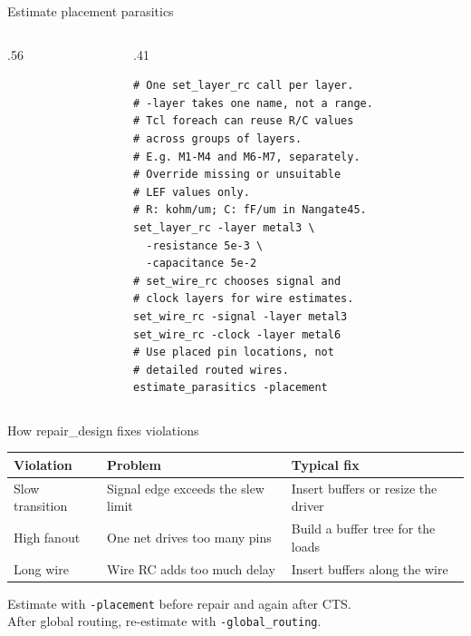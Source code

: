 \begin{frame}[fragile]{Estimate placement parasitics}
\begin{columns}[T,onlytextwidth]
\begin{column}{.56\textwidth}\centering
{}%
\end{column}
\begin{column}{.41\textwidth}
\begin{lstlisting}
# One set_layer_rc call per layer.
# -layer takes one name, not a range.
# Tcl foreach can reuse R/C values
# across groups of layers.
# E.g. M1-M4 and M6-M7, separately.
# Override missing or unsuitable
# LEF values only.
# R: kohm/um; C: fF/um in Nangate45.
set_layer_rc -layer metal3 \
  -resistance 5e-3 \
  -capacitance 5e-2
# set_wire_rc chooses signal and
# clock layers for wire estimates.
set_wire_rc -signal -layer metal3
set_wire_rc -clock -layer metal6
# Use placed pin locations, not
# detailed routed wires.
estimate_parasitics -placement
\end{lstlisting}
\end{column}
\end{columns}
\end{frame}

\begin{frame}{How repair\_design fixes violations}
\centering
\renewcommand{\arraystretch}{1.65}
\setlength{\tabcolsep}{6pt}
\small
\begin{tabular}{>{\raggedright\arraybackslash}p{}>{\raggedright\arraybackslash}p{}>{\raggedright\arraybackslash}p{}}
\textcolor{NordBlue}{\textbf{Violation}} &
\textcolor{NordBlue}{\textbf{Problem}} &
\textcolor{NordBlue}{\textbf{Typical fix}} \\
\hline
Slow transition &
Signal edge exceeds the slew limit &
Insert buffers or resize the driver \\
High fanout &
One net drives too many pins &
Build a buffer tree for the loads \\
Long wire &
Wire RC adds too much delay &
Insert buffers along the wire
\end{tabular}

\vspace{1em}
\small Estimate with \texttt{-placement} before repair and again after CTS.\\
After global routing, re-estimate with \texttt{-global\_routing}.
\end{frame}

